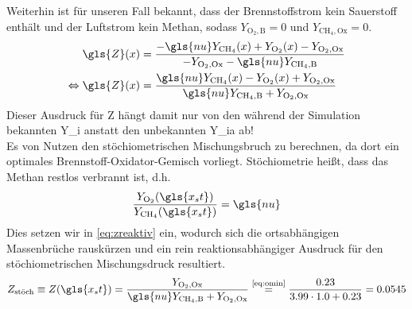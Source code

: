 Weiterhin ist für unseren Fall bekannt, dass der Brennstoffstrom kein Sauerstoff enthält und der Luftstrom kein Methan, sodass $Y_{\mathrm{O}_2,\text{B}}=0$ und $Y_{\mathrm{CH}_4,\text{Ox}}=0$.
\begin{align}
    \gls{Z}(x) & = \frac{ - \gls{nu}
        Y_{\mathrm{CH}_4}(x) + Y_{\mathrm{O}_2}(x) - Y_{\mathrm{O}_2,\text{Ox}}
    }{
        - Y_{\mathrm{O}_2,\text{Ox}} - \gls{nu} Y_{\mathrm{CH}_4,\text{B}}
    }
    \\
    \label{eq:zreaktiv}
    \Leftrightarrow
    \gls{Z}(x) & =
        \frac{
            \gls{nu}
            Y_{\mathrm{CH}_4}(x) -
            Y_{\mathrm{O}_2}(x) +
            Y_{\mathrm{O}_2,\text{Ox}}
        }{
            \gls{nu}
            Y_{\mathrm{CH}_4,\text{B}} +
            Y_{\mathrm{O}_2,\text{Ox}}
        }
\end{align}
Dieser Ausdruck für \gls{Z} hängt damit nur von den während der Simulation bekannten \gls{Y_i} anstatt den unbekannten \gls{Y_ia} ab!\\

Es von Nutzen den stöchiometrischen Mischungsbruch zu berechnen, da dort ein optimales Brennstoff-Oxidator-Gemisch vorliegt. %
Stöchiometrie heißt, dass das Methan restlos verbrannt ist, d.h.
\begin{align}
    \label{eq:xst}
    \frac{ Y_{\mathrm{O}_2 }( \gls{x_st} ) }
         { Y_{\mathrm{CH}_4}( \gls{x_st} ) }
    = \gls{nu}
\end{align}
Dies setzen wir in \autoref{eq:zreaktiv} ein, wodurch sich die ortsabhängigen Massenbrüche rauskürzen und ein rein reaktionsabhängiger Ausdruck für den stöchiometrischen Mischungsdruck resultiert.
\begin{align}
    \label{eq:zstoch}
    Z_\text{stöch} \equiv Z( \gls{x_st} )
    = \frac{ Y_{\mathrm{O}_2,\text{Ox}} }
           { \gls{nu} Y_{\mathrm{CH}_4,\text{B}} + Y_{\mathrm{O}_2,\text{Ox}} }
    \overset{\text{\autoref{eq:omin}}}{=}
        \frac{ 0.23 }{ 3.99\cdot 1.0 + 0.23 } = 0.0545
\end{align}

